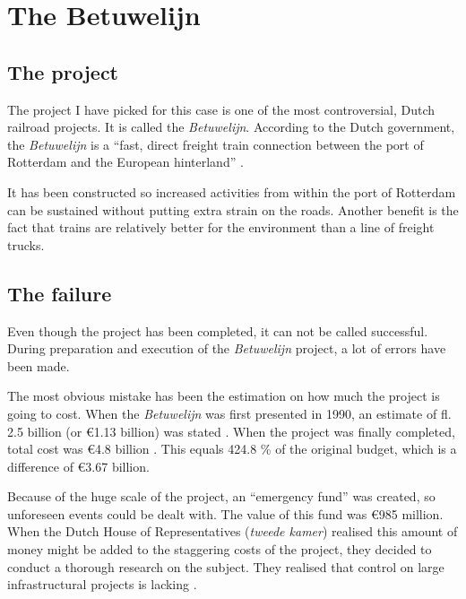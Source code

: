 \documentclass[]{uva-bachelor-thesis}
\title{\course}
\subtitle{\assignment}
\author{\group}
\begin{document}
\maketitle

\setlength{\parskip}{0px}
\tableofcontents
\setlength{\parskip}{.5em}

\clearpage
\chapter{The Betuwelijn}
\section{The project}
The project I have picked for this case is one of the most controversial, Dutch railroad projects.
It is called the \emph{Betuwelijn}. 
According to the Dutch government, the \emph{Betuwelijn} is a ``fast, direct freight train connection between the port of Rotterdam and the European hinterland'' \cite{betuweinfo}.

It has been constructed so increased activities from within the port of Rotterdam can be sustained without putting extra strain on the roads. 
Another benefit is the fact that trains are relatively better for the environment than a line of freight trucks. 

\section{The failure}
Even though the project has been completed, it can not be called successful. 
During preparation and execution of the \emph{Betuwelijn} project, a lot of errors have been made.

The most obvious mistake has been the estimation on how much the project is going to cost. 
When the \emph{Betuwelijn} was first presented in 1990, an estimate of fl. 2.5 billion (or \euro 1.13 billion) was stated \cite{commissie-duivesteijn}.
When the project was finally completed, total cost was \euro 4.8 billion \cite{commissie-duivesteijn}. 
This equals 424.8 \% of the original budget, which is a difference of \euro 3.67 billion.

Because of the huge scale of the project, an ``emergency fund'' was created, so unforeseen events could be dealt with. 
The value of this fund was \euro 985 million. 
When the Dutch House of Representatives (\emph{tweede kamer}) realised this amount of money might be added to the staggering costs of the project, they decided to conduct a thorough research on the subject.
They realised that control on large infrastructural projects is lacking \cite{commissie-duivesteijn}.
\end{document}
